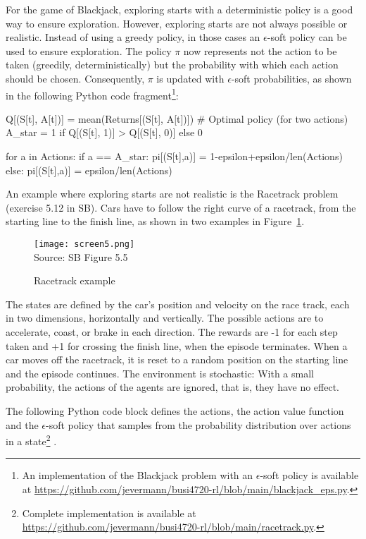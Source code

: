 For the game of Blackjack, exploring starts with a deterministic policy is a good way to ensure exploration. However, exploring starts are not always possible or realistic. Instead of using a greedy policy, in those cases an $\epsilon$-soft policy can be used to ensure exploration. The policy $\pi$ now represents not the action to be taken (greedily, deterministically) but the probability with which each action should be chosen. Consequently, $\pi$ is updated with $\epsilon$-soft probabilities, as shown in the following Python code fragment\footnote{An implementation of the Blackjack problem with an $\epsilon$-soft policy is available at \url{https://github.com/jevermann/busi4720-rl/blob/main/blackjack_eps.py}.}:

\begin{pythoncode}
Q[(S[t], A[t])] = mean(Returns[(S[t], A[t])])
# Optimal policy (for two actions)
A_star = 1 if Q[(S[t], 1)] > Q[(S[t], 0)] else 0

for a in Actions:
    if a == A_star:
        pi[(S[t],a)] = 1-epsilon+epsilon/len(Actions)
    else:
        pi[(S[t],a)] = epsilon/len(Actions)
\end{pythoncode}

An example where exploring starts are not realistic is the Racetrack problem (exercise 5.12 in SB). Cars have to follow the right curve of a racetrack, from the starting line to the finish line, as shown in two examples in Figure~\ref{fig:racetrack}.

\begin{figure}
\centering
\texttt{[image: screen5.png]} \\
\scriptsize Source: SB Figure 5.5 \normalsize
\caption{Racetrack example}
\label{fig:racetrack}
\end{figure}

The states are defined by the car's position and velocity on the race track, each in two dimensions, horizontally and vertically. The possible actions are to accelerate, coast, or brake in each direction. The rewards are -1 for each step taken and +1 for crossing the finish line, when the episode terminates. When a car moves off the racetrack, it is reset to a random position on the starting line and the episode continues. The environment is stochastic: With a small probability, the actions of the agents are ignored, that is, they have no effect.

The following Python code block defines the actions, the action value function and the $\epsilon$-soft policy that samples from the probability distribution over actions in a state\footnote{Complete implementation is available at \url{https://github.com/jevermann/busi4720-rl/blob/main/racetrack.py}.}
. 

